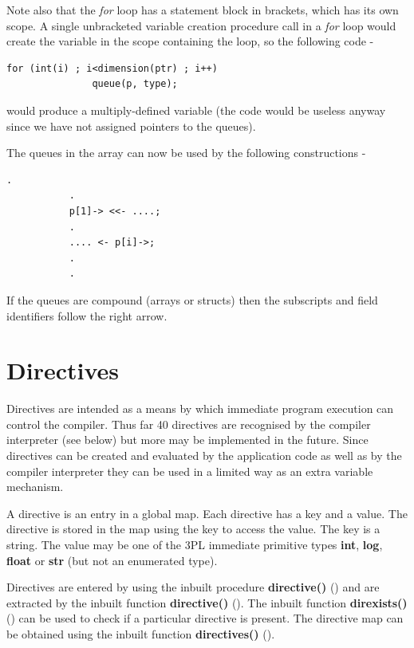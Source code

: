        Note also that the {\em for} loop has a statement block in brackets,
        which has its own scope. A single unbracketed variable creation
        procedure call in a {\em for} loop would create the variable in the
        scope containing the loop, so the following code - 
        \begin{lstlisting}[gobble=8, language=threepl]
           for (int(i) ; i<dimension(ptr) ; i++)
               queue(p, type);
        \end{lstlisting}
        would produce a multiply-defined variable (the code would be useless
        anyway since we have not assigned pointers to the queues).

        The queues in the array can now be used by the following constructions -
        \begin{lstlisting}[gobble=8, language=threepl]
           .
           .
           p[1]-> <<- ....;
           .
           .... <- p[i]->;
           .
           .
        \end{lstlisting}
        If the queues are compound (arrays or structs) then the subscripts and
        field identifiers follow the right arrow.




    \section{Directives}\label{sec:directives}
    
        Directives are intended as a means by which immediate program execution
        can control the compiler. Thus far 40 directives are recognised by
        the compiler interpreter (see below) but more may be implemented in the
        future. Since directives can be created and evaluated by the application
        code as well as by the compiler interpreter they can be used in a
        limited way as an extra variable mechanism.

        A directive is an entry in a global map. Each directive has a key and a
        value. The directive is stored in the map using the key to access the
        value. The key is a string. The value may be one of the 3PL immediate
        primitive types {\bf int}, {\bf log}, {\bf float} or {\bf str} (but not
        an enumerated type).

        Directives are entered by using the inbuilt procedure {\bf
        directive()} () and are extracted by
        the inbuilt function {\bf directive()} ().
        The inbuilt function {\bf direxists()} () can
        be used to check if a particular directive is present. The directive
        map can be obtained using the inbuilt function {\bf directives()}
        ().

